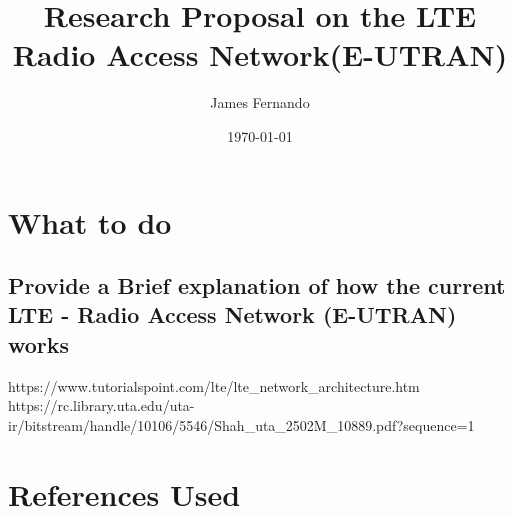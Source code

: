 \documentclass[a4paper,12pt]{scrartcl}
\title{Research Proposal on the LTE Radio Access Network(E-UTRAN)}
\author{James Fernando}
\date{\today}
\begin{document}
	
	\begin{titlepage}
		\maketitle
	\end{titlepage}
	
	\tableofcontents
	\newpage	
	\section{What to do}{
		\subsection{Provide a Brief explanation of how the current LTE - Radio Access Network (E-UTRAN) works}{
			https://www.tutorialspoint.com/lte/lte_network_architecture.htm
			https://rc.library.uta.edu/uta-ir/bitstream/handle/10106/5546/Shah_uta_2502M_10889.pdf?sequence=1
		}
	}
	\section{References Used}
	
	\newpage
	
	\printbibliography[heading=bibintoc,title=References]
\end{document}
